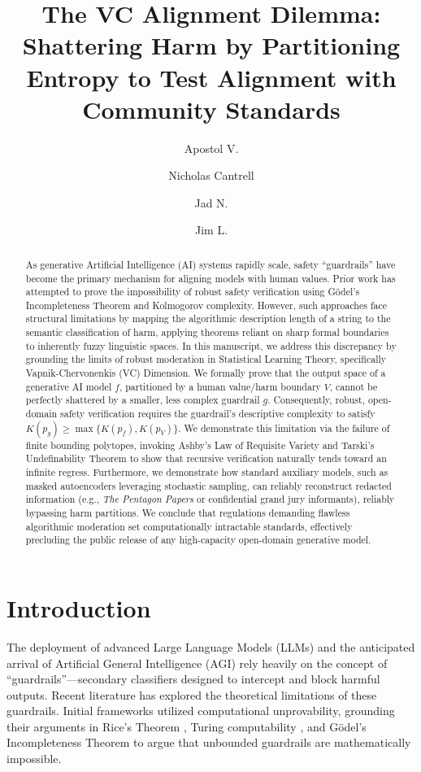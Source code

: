 \documentclass[11pt,twoside,letterpaper]{article}
\title{\bf \Large The VC Alignment Dilemma:\\Shattering Harm by Partitioning Entropy to Test Alignment with Community Standards}
\author[1]{Apostol V.}
\author[2]{Nicholas Cantrell}
\author[3]{Jad N.}
\author[4]{Jim L.}
\affil[1]{\small Affiliation 1}
\affil[2]{\small CyberGolem ASI Research Lab}
\affil[3]{\small Affiliation 3}
\affil[4]{\small Affiliation 4}
\date{\vspace{-5ex}} %
\begin{document}
\maketitle

\begin{abstract}
As generative Artificial Intelligence (AI) systems rapidly scale, safety ``guardrails'' have become the primary mechanism for aligning models with human values. Prior work has attempted to prove the impossibility of robust safety verification using Gödel's Incompleteness Theorem and Kolmogorov complexity. 
However, such approaches face structural limitations by mapping the algorithmic description length of a string to the semantic classification of harm, applying theorems reliant on sharp formal boundaries to inherently fuzzy linguistic spaces. 
In this manuscript, we address this discrepancy by grounding the limits of robust moderation in Statistical Learning Theory, specifically Vapnik-Chervonenkis (VC) Dimension. 
We formally prove that the output space of a generative AI model $f$, partitioned by a human value/harm boundary $V$, cannot be perfectly shattered by a smaller, less complex guardrail $g$. Consequently, robust, open-domain safety verification requires the guardrail's descriptive complexity to satisfy $K(p_g) \geq \max\{K(p_f), K(p_V)\}$. 
We demonstrate this limitation via the failure of finite bounding polytopes, invoking Ashby's Law of Requisite Variety and Tarski's Undefinability Theorem to show that recursive verification naturally tends toward an infinite regress. 
Furthermore, we demonstrate how standard auxiliary models, such as masked autoencoders leveraging stochastic sampling, can reliably reconstruct redacted information (e.g., \textit{The Pentagon Papers} or confidential grand jury informants), reliably bypassing harm partitions. 
We conclude that regulations demanding flawless algorithmic moderation set computationally intractable standards, effectively precluding the public release of any high-capacity open-domain generative model.
\end{abstract}

\section{Introduction}

The deployment of advanced Large Language Models (LLMs) and the anticipated arrival of Artificial General Intelligence (AGI) rely heavily on the concept of ``guardrails''—secondary classifiers designed to intercept and block harmful outputs. Recent literature has explored the theoretical limitations of these guardrails. Initial frameworks \cite{cybergolem2025, vassilev2025} utilized computational unprovability, grounding their arguments in Rice's Theorem \cite{rice1953classes}, Turing computability \cite{turing1936}, and Gödel's Incompleteness Theorem \cite{godel1931} to argue that unbounded guardrails are mathematically impossible. 
\end{document}
